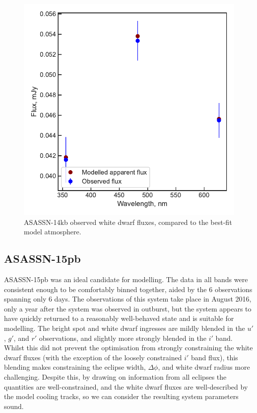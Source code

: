\begin{figure}
    \centering
    \includegraphics[width=\textwidth]{figures/results/ASASSN-14kb/fluxplot.pdf}
    \caption{ASASSN-14kb observed white dwarf fluxes, compared to the best-fit model atmosphere.}
    \label{fig:ASASSN-14kb flux plot}
\end{figure}
\clearpage



\newpage
\subsection{ASASSN-15pb}

ASASSN-15pb was an ideal candidate for modelling. The data in all bands were consistent enough to be comfortably binned together, aided by the 6 observations spanning only 6 days.
The observations of this system take place in August 2016, only a year after the system was observed in outburst, but the system appears to have quickly returned to a reasonably well-behaved state and is suitable for modelling.
The bright spot and white dwarf ingresses are mildly blended in the $u'$, $g'$, and $r'$ observations, and slightly more strongly blended in the $i'$ band. Whilst this did not prevent the optimisation from strongly constraining the white dwarf fluxes (with the exception of the loosely constrained $i'$ band flux), this blending makes constraining the eclipse width, $\Delta\phi$, and white dwarf radius more challenging. Despite this, by drawing on information from all eclipses the quantities are well-constrained, and the white dwarf fluxes are well-described by the model cooling tracks, so we can consider the resulting system parameters sound.

